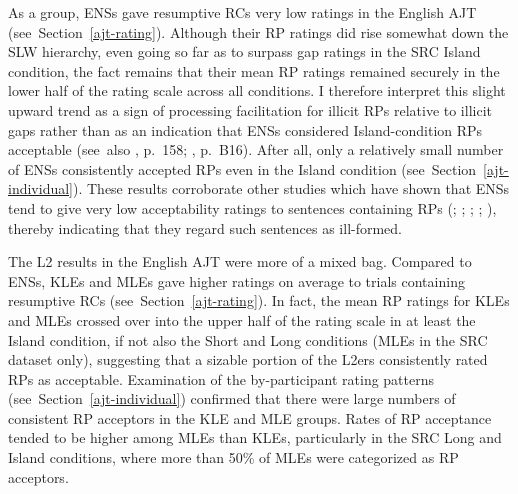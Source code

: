As a group, ENSs gave resumptive RCs very low ratings in the English AJT (see~Section~\ref{ajt-rating}). Although their RP ratings did rise somewhat down the SLW hierarchy, even going so far as to surpass gap ratings in the SRC Island condition, the fact remains that their mean RP ratings remained securely in the lower half of the rating scale across all conditions. I therefore interpret this slight upward trend as a sign of processing facilitation for illicit RPs relative to illicit gaps rather than as an indication that ENSs considered Island-condition RPs acceptable (see~also \cite{han.etal2012}, p.~158; \cite{mcdaniel.cowart1999}, p.~B16). After all, only a relatively small number of ENSs consistently accepted RPs even in the Island condition (see~Section~\ref{ajt-individual}). These results corroborate other studies which have shown that ENSs tend to give very low acceptability ratings to sentences containing RPs (\cite{alexopoulou.keller2007}; \cite{han.etal2012}; \cite{heestand.etal2011}; \cite{keffala.goodall2011}; \cite{mcdaniel.cowart1999}), thereby indicating that they regard such sentences as ill-formed.

The L2 results in the English AJT were more of a mixed bag. Compared to ENSs, KLEs and MLEs gave higher ratings on average to trials containing resumptive RCs (see~Section~\ref{ajt-rating}). In fact, the mean RP ratings for KLEs and MLEs crossed over into the upper half of the rating scale in at least the Island condition, if not also the Short and Long conditions (MLEs in the SRC dataset only), suggesting that a sizable portion of the L2ers consistently rated RPs as acceptable. Examination of the by-participant rating patterns (see~Section~\ref{ajt-individual}) confirmed that there were large numbers of consistent RP acceptors in the KLE and MLE groups. Rates of RP acceptance tended to be higher among MLEs than KLEs, particularly in the SRC Long and Island conditions, where more than 50\% of MLEs were categorized as RP acceptors.

